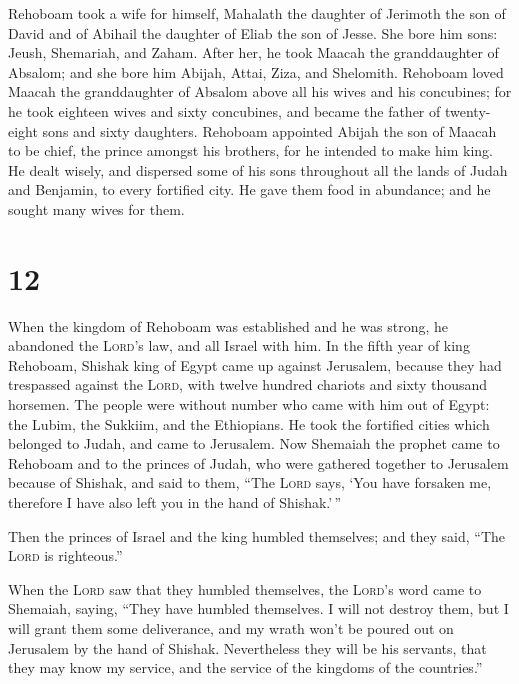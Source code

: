  Rehoboam took a wife for himself, Mahalath the daughter
of Jerimoth the son of David and of Abihail the daughter of Eliab the
son of Jesse.  She bore him sons: Jeush, Shemariah, and
Zaham.  After her, he took Maacah the granddaughter of
Absalom; and she bore him Abijah, Attai, Ziza, and Shelomith.
 Rehoboam loved Maacah the granddaughter of Absalom above
all his wives and his concubines; for he took eighteen wives and sixty
concubines, and became the father of twenty-eight sons and sixty
daughters.  Rehoboam appointed Abijah the son of Maacah
to be chief, the prince amongst his brothers, for he intended to make
him king.  He dealt wisely, and dispersed some of his
sons throughout all the lands of Judah and Benjamin, to every fortified
city. He gave them food in abundance; and he sought many wives for them.

\hypertarget{section-11}{%
\section{12}\label{section-11}}

 When the kingdom of Rehoboam was established and he was
strong, he abandoned the \textsc{Lord}'s law, and all Israel with him.
 In the fifth year of king Rehoboam, Shishak king of Egypt
came up against Jerusalem, because they had trespassed against the
\textsc{Lord},  with twelve hundred chariots and sixty
thousand horsemen. The people were without number who came with him out
of Egypt: the Lubim, the Sukkiim, and the Ethiopians.  He
took the fortified cities which belonged to Judah, and came to
Jerusalem.  Now Shemaiah the prophet came to Rehoboam and
to the princes of Judah, who were gathered together to Jerusalem because
of Shishak, and said to them, ``The \textsc{Lord} says, `You have
forsaken me, therefore I have also left you in the hand of Shishak.'\,''

 Then the princes of Israel and the king humbled
themselves; and they said, ``The \textsc{Lord} is righteous.''

 When the \textsc{Lord} saw that they humbled themselves,
the \textsc{Lord}'s word came to Shemaiah, saying, ``They have humbled
themselves. I will not destroy them, but I will grant them some
deliverance, and my wrath won't be poured out on Jerusalem by the hand
of Shishak.  Nevertheless they will be his servants, that
they may know my service, and the service of the kingdoms of the
countries.''

